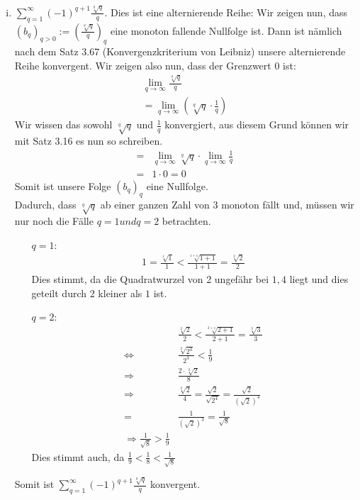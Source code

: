\documentclass{scrartcl}
\begin{document}
\begin{enumerate}[(i)]
		\item $\sum^{\infty}_{q=1}(-1)^{q+1}\frac{\sqrt[q]{q}}{q}$. Dies ist eine alternierende Reihe: Wir zeigen nun, dass $(b_q)_{q > 0}:=\left(\frac{\sqrt[q]{q}}{q}\right)_q$ eine monoton fallende Nullfolge ist. Dann ist nämlich nach dem Satz 3.67 (Konvergenzkriterium von Leibniz) unsere alternierende Reihe konvergent. Wir zeigen also nun, dass der Grenzwert $0$ ist:
			\begin{align*}
				\lim_{q \to \infty}\frac{\sqrt[q]{q}}{q} \\
				= \lim_{q \to \infty}\left(\sqrt[q]{q}\cdot \frac{1}{q}\right)
			\end{align*}
			Wir wissen das sowohl $\sqrt[q]{q}$ und $\frac{1}{q}$ konvergiert, aus diesem Grund können wir mit Satz 3.16 es nun so schreiben.
			\begin{align*}
				= &\lim_{q \to \infty}\sqrt[q]{q}\cdot \lim_{q \to \infty}\frac{1}{q} \\
				= &1 \cdot 0 = 0
			\end{align*}
			Somit ist unsere Folge $(b_q)_q$ eine Nullfolge. \\
			Dadurch, dass $\sqrt[q]{q}$ ab einer ganzen Zahl von $3$ monoton fällt und, müssen wir nur noch die Fälle $q=1 und q=2$ betrachten.
			\begin{itemize}
				\item[$q=1$:]	\begin{align*}
									1 = \frac{\sqrt[1]{1}}{1} < \frac{\sqrt[1+1]{1+1}}{1+1} = \frac{\sqrt[2]{2}}{2}
								\end{align*}
								Dies stimmt, da die Quadratwurzel von 2 ungefähr bei $1,4$ liegt und dies geteilt durch $2$ kleiner als $1$ ist.
				\item[$q=2$:]	\begin{align*}
									&\frac{\sqrt[2]{2}}{2} < \frac{\sqrt[2+1]{2+1}}{2+1} = \frac{\sqrt[3]{3}}{3} \\
									\Leftrightarrow &\frac{\sqrt[2]{2^3}}{2^3} < \frac{1}{9} \\
									\Rightarrow &\frac{2 \cdot \sqrt[2]{2}}{8} \\
									\Rightarrow &\frac{\sqrt[2]{2}}{4} = \frac{\sqrt{2}}{\sqrt{2^4}} = \frac{\sqrt{2}}{(\sqrt{2})^4} \\
									= &\frac{1}{(\sqrt{2})^3} = \frac{1}{\sqrt{8}} \\
									\Rightarrow \frac{1}{\sqrt{8}} > \frac{1}{9}
								\end{align*}
								Dies stimmt auch, da $\frac{1}{9} < \frac{1}{8} < \frac{1}{\sqrt{8}}$
			\end{itemize}
			Somit ist $\sum^{\infty}_{q=1}(-1)^{q+1}\frac{\sqrt[q]{q}}{q}$ konvergent.	
			

\end{enumerate}
\end{document}
